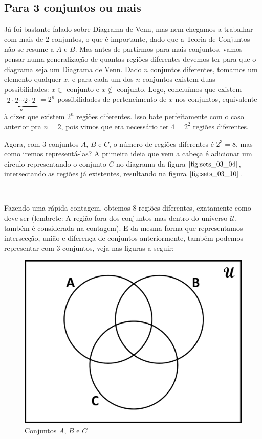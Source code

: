 \subsection{Para 3 conjuntos ou mais}
Já foi bastante falado sobre Diagrama de Venn, mas nem chegamos a trabalhar com mais de $2$ conjuntos, o que é importante, dado que a Teoria de Conjuntos não se resume a $A$ e $B$. Mas antes de partirmos para mais conjuntos, vamos pensar numa generalização de quantas regiões diferentes devemos ter para que o diagrama seja um Diagrama de Venn. Dado $n$ conjuntos diferentes, tomamos um elemento qualquer $x$, e para cada um dos $n$ conjuntos existem duas possibilidades: $x \in $ conjunto e $x \notin $ conjunto. Logo, concluímos que existem $\underbrace{\begin{matrix} 2\cdot2\cdots2\cdot2\end{matrix}}_{n} = 2^n$ possibilidades de pertencimento de $x$ nos conjuntos, equivalente à dizer que existem $2^n$ regiões diferentes. Isso bate perfeitamente com o caso anterior pra $n=2$, pois vimos que era necessário ter $4=2^2$ regiões diferentes.

Agora, com $3$ conjuntos $A$, $B$ e $C$, o número de regiões diferentes é $2^3=8$, mas como iremos representá-las? A primeira ideia que vem a cabeça é adicionar um círculo representando o conjunto $C$ no diagrama da figura $\ref{fig:sets_03_04}$, intersectando as regiões já existentes, resultando na figura $\ref{fig:sets_03_10}$.

$\qquad$

Fazendo uma rápida contagem, obtemos $8$ regiões diferentes, exatamente como deve ser (lembrete: A região fora dos conjuntos mas dentro do universo $\mathcal U$, também é considerada na contagem). E da mesma forma que representamos intersecção, união e diferença de conjuntos anteriormente, também podemos representar com $3$ conjuntos, veja nas figuras a seguir:

\begin{figure}[ht!]
  \centering
  \includegraphics[scale=0.3]{figures/sets/fig_sets_03_10.pdf}
  \caption{Conjuntos $A$, $B$ e $C$}
  \label{fig:sets_03_10}
\end{figure}

